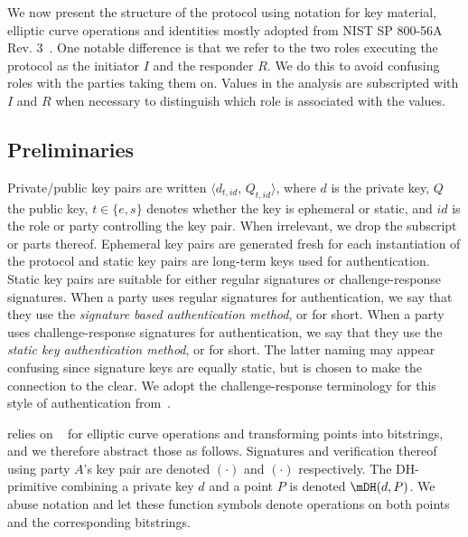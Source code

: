 
We now present the structure of the protocol using notation for key material,
elliptic curve operations and
identities mostly adopted from NIST SP 800-56A Rev. 3~\cite{sp800-56a-rev3}.
%
One notable difference is that we refer to the two roles executing the protocol
as the initiator $I$ and the responder $R$.
%
We do this to avoid confusing roles with the parties taking them on.
%
Values in the analysis are subscripted with $I$ and $R$ when necessary to
distinguish which role is associated with the values.
%

\subsection{Preliminaries}
\label{sec:preliminaries}
Private/public key pairs are written
$\langle d_{t,\mathit{id}},\,Q_{t,\mathit{id}}\rangle$,
where $d$ is the private key, $Q$ the public key, $t \in \{e, s\}$ denotes
whether the key is ephemeral or static, and $\mathit{id}$ is the role or
party controlling the key pair.
%
When irrelevant, we drop the subscript or parts thereof.
%
Ephemeral key pairs are generated fresh for each instantiation of the protocol
and static key pairs are long-term keys used for authentication.
%
Static key pairs are suitable for either regular signatures or
challenge-response signatures.
%
When a party uses regular signatures for authentication, we say that they use
the \emph{signature based authentication method}, or \mSig{} for short.
%
When a party uses challenge-response signatures for authentication, we say that
they use the \emph{static key authentication method}, or \mStat{} for short.
%
The latter naming may appear confusing since signature keys are equally static,
but is chosen to make the connection to the \mSpec{} clear.
%
We adopt the challenge-response terminology for this style of authentication
from~\cite{DBLP:conf/crypto/Krawczyk05}.
%

\mEdhoc{} relies on \mCose{}~\cite{rfc8152} for elliptic curve operations and
transforming points into bitstrings, and we therefore abstract those as
follows.
%
Signatures and verification thereof using party $A$'s key pair are
denoted $(\cdot)$ and $(\cdot)$ respectively.
%
The DH-primitive combining a private key $d$ and a point $P$ is denoted
$\mDH(d,P)$.
%
We abuse notation and let these function symbols denote operations on both
points and the corresponding bitstrings.
%

